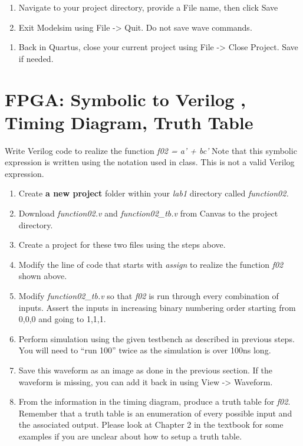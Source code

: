 \begin{enumerate}
\def\labelenumi{\alph{enumi}.}
\setcounter{enumi}{4}
\item
  Navigate to your project directory, provide a File name, then click
  Save
\item
  Exit Modelsim using File -\textgreater{} Quit. Do not save wave
  commands.
\end{enumerate}

\begin{enumerate}
\def\labelenumi{\arabic{enumi}.}
\setcounter{enumi}{23}
\item
  Back in Quartus, close your current project using File -\textgreater{}
  Close Project. Save if needed.
\end{enumerate}


\section{FPGA: Symbolic to Verilog , Timing Diagram, Truth Table}
Write Verilog code to realize the function \emph{f02 = a' + bc'} Note
that this symbolic expression is written using the notation used in
class. This is not a valid Verilog expression.

\begin{enumerate}
\def\labelenumi{\arabic{enumi}.}
\item
  Create \textbf{a new project} folder within your \emph{lab1} directory
  called \emph{function02.}
\item
  Download \emph{function02.v} and \emph{function02\_tb.v} from Canvas
  to the project directory.
\item
  Create a project for these two files using the steps above.
\item
  \protect\hypertarget{Part_2_Step_4}{}{}Modify the line of code that
  starts with \emph{assign} to realize the function \emph{f02} shown
  above.
\item
  Modify \emph{function02\_tb.v} so that \emph{f02} is run through every
  combination of inputs. Assert the inputs in increasing binary
  numbering order starting from 0,0,0 and going to 1,1,1.
\item
  Perform simulation using the given testbench as described in previous
  steps. You will need to ``run 100'' twice as the simulation is over
  100ns long.
\item
  \protect\hypertarget{Part_2_Step_7}{}{}Save this waveform as an image
  as done in the previous section. If the waveform is missing, you can
  add it back in using View -\textgreater{} Waveform.
\item
  \protect\hypertarget{Part_2_Step_8}{}{}From the information in the
  timing diagram, produce a truth table for \emph{f02}. Remember that a
  truth table is an enumeration of every possible input and the
  associated output. Please look at Chapter 2 in the textbook for some
  examples if you are unclear about how to setup a truth table.
\end{enumerate}


